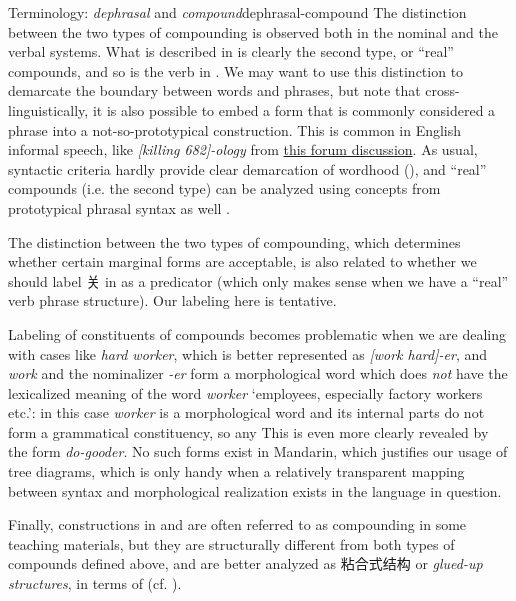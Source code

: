 \documentclass[UTF8, a4paper, oneside, scheme=plain, 12pt]{ctexrep}
\newcommand*{\term}[1]{\emph{#1}}
\newcommand{\form}[1]{\emph{#1}}
\newcommand{\translate}[1]{`#1'}
\begin{document}
\begin{theorybox}{Terminology: \term{dephrasal} and \term{compound}}{dephrasal-compound}
    The distinction between the two types of compounding is observed both in the nominal and the verbal systems.
    What is described in  is clearly the second type, or ``real'' compounds,
    and so is the verb in .
    We may want to use this distinction to demarcate the boundary between words and phrases,
    but note that cross-linguistically, it is also possible to embed a form that is commonly considered a phrase
    into a not-so-prototypical construction.
    This is common in English informal speech,
    like \form{[killing 682]-ology} from \href{https://scp-wiki.wikidot.com/forum/t-410418/scp-1066}{this forum discussion}.
    As usual, syntactic criteria hardly provide clear demarcation of wordhood
    (),
    and ``real'' compounds (i.e. the second type) can be analyzed using concepts from prototypical phrasal syntax as well \citep{scher2014unifying}.
    
    The distinction between the two types of compounding,
    which determines whether certain marginal forms are acceptable,
    is also related to whether we should label 关 in  as a predicator (which only makes sense when we have a ``real'' verb phrase structure).
    Our labeling here is tentative. 

    Labeling of constituents of compounds becomes problematic 
    when we are dealing with cases like \form{hard worker},
    which is better represented as \form{[work hard]-er},
    and \form{work} and the nominalizer \form{-er} form a morphological word
    which does \emph{not} have the lexicalized meaning of the word \form{worker}
    \translate{employees, especially factory workers etc.}:
    in this case \form{worker} is a morphological word
    and its internal parts do not form a grammatical constituency,
    so any 
    This is even more clearly revealed by the form \form{do-gooder}.
    No such forms exist in Mandarin,
    which justifies our usage of tree diagrams,
    which is only handy when a relatively transparent mapping between syntax 
    and morphological realization exists in the language in question. 
    
    Finally, constructions in  and  are often referred to as compounding in some teaching materials,
    but they are structurally different from both types of compounds defined above,
    and are better analyzed as 粘合式结构 or \term{glued-up structures},
    in terms of \citet{zhudexigrammar} (cf. ).
\end{theorybox}
\end{document}
